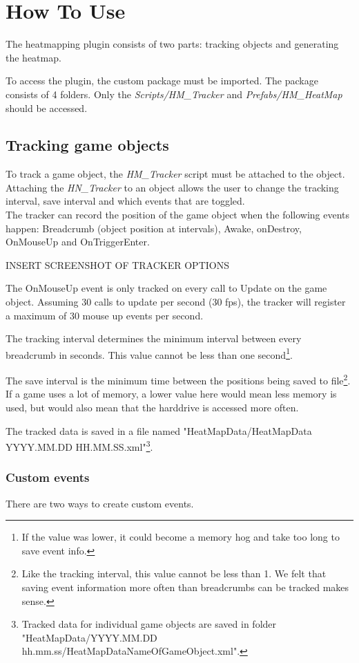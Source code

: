 \section{How To Use}
\label{HowToUse}
The heatmapping plugin consists of two parts: tracking objects and generating the heatmap.

To access the plugin, the custom package must be imported. The package consists of 4 folders. Only the \textit{Scripts/HM\_Tracker} and \textit{Prefabs/HM\_HeatMap} should be accessed.

\subsection{Tracking game objects}
\label{HowToUse_Tracking}
To track a game object, the \textit{HM\_Tracker} script must be attached to the object. Attaching the \textit{HN\_Tracker} to an object allows the user to change the tracking interval, save interval and which events that are toggled.
\\The tracker can record the position of the game object when the following events happen: Breadcrumb (object position at intervals), Awake, onDestroy, OnMouseUp and OnTriggerEnter.

INSERT SCREENSHOT OF TRACKER OPTIONS

The OnMouseUp event is only tracked on every call to Update on the game object. Assuming 30 calls to update per second (30 fps), the tracker will register a maximum of 30 mouse up events per second.

The tracking interval determines the minimum interval between every breadcrumb in seconds. This value cannot be less than one second\footnote{If the value was lower, it could become a memory hog and take too long to save event info.}.

The save interval is the minimum time between the positions being saved to file\footnote{Like the tracking interval, this value cannot be less than 1. We felt that saving event information more often than breadcrumbs can be tracked makes sense.}. 
If a game uses a lot of memory, a lower value here would mean less memory is used, but would also mean that the harddrive is accessed more often.

The tracked data is saved in a file named "HeatMapData/HeatMapData YYYY.MM.DD HH.MM.SS.xml"\footnote{Tracked data for individual game objects are saved in folder "HeatMapData/YYYY.MM.DD hh.mm.ss/HeatMapDataNameOfGameObject.xml".}.

\subsubsection{Custom events}
There are two ways to create custom events. 

